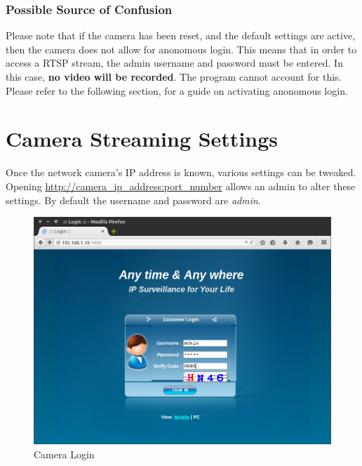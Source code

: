 \documentclass[a4paper,11pt]{report}
\begin{document}
\subsubsection{Possible Source of Confusion}
Please note that if the camera has been reset, and the default settings are active, then the camera does not allow for anonomous login. This means that in order to access a RTSP stream, the admin username and password must be entered. In this case, \textbf{no video will be recorded}. The program cannot account for this. Please refer to the following section, for a guide on activating anonomous login.

\section{Camera Streaming Settings}
Once the network camera's IP address is known, various settings can be tweaked. Opening \url{http://camera_ip_address:port_number} allows an admin to alter these settings. By default the username and password are \textit{admin}.
 \begin{figure}[h]
   \begin{center}
     \includegraphics[scale=0.3]{camera_login}
     \caption{Camera Login}
   \end{center}
 \end{figure}
\end{document}
